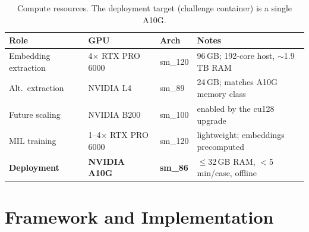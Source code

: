 \documentclass[11pt,a4paper]{article}
\begin{document}
\begin{table}[h]
\centering
\caption{Compute resources. The deployment target (challenge container) is a single A10G.}
\label{tab:hw}
\begin{tabular}{llll}
\toprule
Role & GPU & Arch & Notes \\
\midrule
Embedding extraction & 4$\times$ RTX PRO 6000 & sm\_120 & 96\,GB; 192-core host, $\sim$1.9\,TB RAM \\
Alt.\ extraction & NVIDIA L4 & sm\_89 & 24\,GB; matches A10G memory class \\
Future scaling & NVIDIA B200 & sm\_100 & enabled by the cu128 upgrade \\
MIL training & 1--4$\times$ RTX PRO 6000 & sm\_120 & lightweight; embeddings precomputed \\
\textbf{Deployment} & \textbf{NVIDIA A10G} & \textbf{sm\_86} & $\le$32\,GB RAM, $<$5\,min/case, offline \\
\bottomrule
\end{tabular}
\end{table}

\section{Framework and Implementation}
\label{sec:framework}
\end{document}
